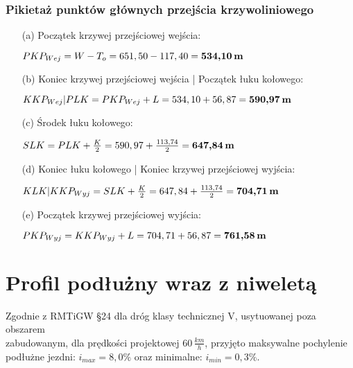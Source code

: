 \documentclass[12pt]{article}
\begin{document}
            \subsubsection{Pikietaż punktów głównych przejścia krzywoliniowego}
                \begin{itemize}
                    \item[(a)] Początek krzywej przejściowej wejścia:
                         
                        \qquad \( PKP_{Wej} = W - T_{o} = 651,50 - 117,40 = \mbox{\textbf{534,10\,m}} \) 
                        
                    \item[(b)] Koniec krzywej przejściowej wejścia | Początek łuku kołowego:
                        
                        \qquad \( KKP_{Wej}  |  PLK = PKP_{Wej} + L =534,10 + 56,87 = \mbox{\textbf{590,97\,m}} \)
                        
                    \item[(c)] Środek łuku kołowego:
                        
                        \qquad \( SLK = PLK + \frac{K}{2} = 590,97 + \frac{113,74}{2} = \mbox{\textbf{647,84\,m}} \)
                        
                    \item[(d)] Koniec łuku kołowego | Koniec krzywej przejściowej wyjścia:
                        
                        \qquad \( KLK | KKP_{Wyj} = SLK + \frac{K}{2} = 647,84 + \frac{113,74}{2} = \mbox{\textbf{704,71\,m}} \)
                    
                    \item[(e)] Początek krzywej przejściowej wyjścia:
                    
                        \qquad \( PKP_{Wyj} = KKP_{Wyj} + L = 704,71 + 56,87 = \mbox{\textbf{761,58\,m}} \)
                        
                \end{itemize}
\section{Profil podłużny wraz z niweletą}
    Zgodnie z RMTiGW §24 dla dróg klasy technicznej V, usytuowanej poza obszarem\\
    zabudowanym, dla prędkości projektowej \(60\,\frac{km}{h}\), przyjęto maksywalne pochylenie\\
    podłużne jezdni: \( i_{max} = 8,0\% \) oraz minimalne: \( i_{min} = 0,3\% \).
\end{document}
